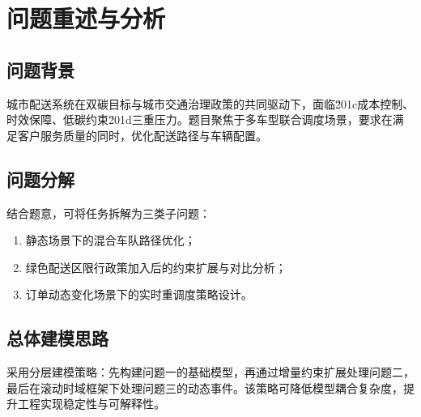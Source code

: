 \section{问题重述与分析}

\subsection{问题背景}
城市配送系统在双碳目标与城市交通治理政策的共同驱动下，面临\u201c成本控制、时效保障、低碳约束\u201d三重压力。题目聚焦于多车型联合调度场景，要求在满足客户服务质量的同时，优化配送路径与车辆配置。

\subsection{问题分解}
结合题意，可将任务拆解为三类子问题：
\begin{enumerate}[label=\arabic*)]
    \item 静态场景下的混合车队路径优化；
    \item 绿色配送区限行政策加入后的约束扩展与对比分析；
    \item 订单动态变化场景下的实时重调度策略设计。
\end{enumerate}

\subsection{总体建模思路}
采用分层建模策略：先构建问题一的基础模型，再通过增量约束扩展处理问题二，最后在滚动时域框架下处理问题三的动态事件。该策略可降低模型耦合复杂度，提升工程实现稳定性与可解释性。
